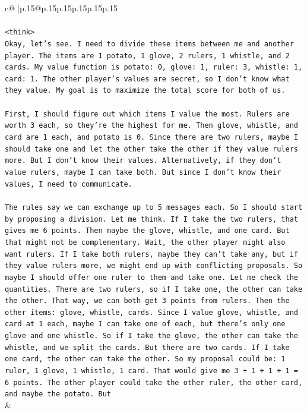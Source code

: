 \documentclass{article}
\begin{document}
{\begin{supertabular}{c@{$\;$}|p{.15\linewidth}@{}p{.15\linewidth}p{.15\linewidth}p{.15\linewidth}p{.15\linewidth}p{.15\linewidth}}
{{{\\ 
\\ 
\texttt{<think>} \\
\texttt{Okay, let's see. I need to divide these items between me and another player. The items are 1 potato, 1 glove, 2 rulers, 1 whistle, and 2 cards. My value function is potato: 0, glove: 1, ruler: 3, whistle: 1, card: 1. The other player's values are secret, so I don't know what they value. My goal is to maximize the total score for both of us.} \\
\\ 
\texttt{First, I should figure out which items I value the most. Rulers are worth 3 each, so they're the highest for me. Then glove, whistle, and card are 1 each, and potato is 0. Since there are two rulers, maybe I should take one and let the other take the other if they value rulers more. But I don't know their values. Alternatively, if they don't value rulers, maybe I can take both. But since I don't know their values, I need to communicate.} \\
\\ 
\texttt{The rules say we can exchange up to 5 messages each. So I should start by proposing a division. Let me think. If I take the two rulers, that gives me 6 points. Then maybe the glove, whistle, and one card. But that might not be complementary. Wait, the other player might also want rulers. If I take both rulers, maybe they can't take any, but if they value rulers more, we might end up with conflicting proposals. So maybe I should offer one ruler to them and take one. Let me check the quantities. There are two rulers, so if I take one, the other can take the other. That way, we can both get 3 points from rulers. Then the other items: glove, whistle, cards. Since I value glove, whistle, and card at 1 each, maybe I can take one of each, but there's only one glove and one whistle. So if I take the glove, the other can take the whistle, and we split the cards. But there are two cards. If I take one card, the other can take the other. So my proposal could be: 1 ruler, 1 glove, 1 whistle, 1 card. That would give me 3 + 1 + 1 + 1 = 6 points. The other player could take the other ruler, the other card, and maybe the potato. But} \\
            }
        }
    }
    & \\ \\


\end{supertabular}}
\end{document}
